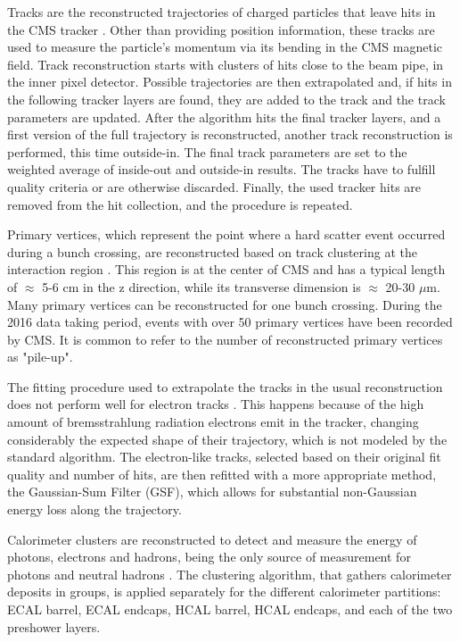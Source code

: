 Tracks are the reconstructed trajectories of charged particles that leave hits in the CMS tracker \cite{cms_track}. 
Other than providing position information, these tracks are used to measure the particle's momentum via its bending in the CMS magnetic field. 
Track reconstruction starts with clusters of hits close to the beam pipe, in the inner pixel detector. 
Possible trajectories are then extrapolated and, if hits in the following tracker layers are found, they are added to the track and the track parameters are updated. 
After the algorithm hits the final tracker layers, and a first version of the full trajectory is reconstructed, another track reconstruction is performed, this time outside-in. 
The final track parameters are set to the weighted average of inside-out and outside-in results. 
The tracks have to fulfill quality criteria or are otherwise discarded. 
Finally, the used tracker hits are removed from the hit collection, and the procedure is repeated.

Primary vertices, which represent the point where a hard scatter event occurred during a bunch crossing, are reconstructed based on track clustering at the interaction region \cite{cms_track}. 
This region is at the center of CMS and has a typical length of $\approx$ 5-6 cm in the z direction, while its transverse dimension is $\approx$ 20-30 $\mu$m. 
Many primary vertices can be reconstructed for one bunch crossing. 
During the 2016 data taking period, events with over 50 primary vertices have been recorded by CMS. 
It is common to refer to the number of reconstructed primary vertices as "pile-up".

The fitting procedure used to extrapolate the tracks in the usual reconstruction does not perform well for electron tracks \cite{cms_track}. 
This happens because of the high amount of bremsstrahlung radiation electrons emit in the tracker, changing considerably the expected shape of their trajectory, which is not modeled by the standard algorithm. 
The electron-like tracks, selected based on their original fit quality and number of hits, are then refitted with a more appropriate method, the Gaussian-Sum Filter (GSF), which allows for substantial non-Gaussian energy loss along the trajectory.

Calorimeter clusters are reconstructed to detect and measure the energy of photons, electrons and hadrons, being the only source of measurement for photons and neutral hadrons \cite{cms_pf}. 
The clustering algorithm, that gathers calorimeter deposits in groups, is applied separately for the different calorimeter partitions: ECAL barrel, ECAL endcaps, HCAL barrel, HCAL endcaps, and each of the two preshower layers. 

